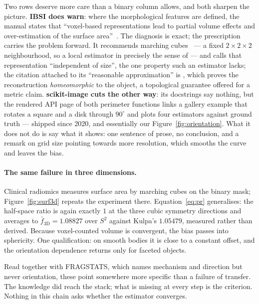 \documentclass{article}
\begin{document}
Two rows deserve more care than a binary column allows, and both sharpen the picture.
\textbf{IBSI does warn}: where the morphological features are defined, the manual states that
``voxel-based representations lead to partial volume effects and over-estimation of the surface
area''~\citep{ibsi2019}. The diagnosis is exact; the prescription carries the problem forward. It
recommends marching cubes~\citep{lorensen1987} --- a fixed $2\times2\times2$ neighbourhood, so a
local estimator in precisely the sense of \citet{tajine2003} --- and calls that representation
``independent of size'', the one property such an estimator lacks; the citation attached to its
``reasonable approximation'' is \citet{stelldinger2007}, which proves the reconstruction
\emph{homeomorphic} to the object, a topological guarantee offered for a metric claim.
\textbf{scikit-image cuts the other way}: its docstrings say nothing, but the rendered API page of
both perimeter functions links a gallery example that rotates a square and a disk through
$90^\circ$ and plots four estimators against ground truth --- shipped since 2020, and essentially
our Figure~\ref{fig:orientation}. What it does not do is say what it shows: one sentence of prose,
no conclusion, and a remark on grid size pointing towards more resolution, which smooths the curve
and leaves the bias.

\paragraph{The same failure in three dimensions.} Clinical radiomics measures surface area by
marching cubes on the binary mask; Figure~\ref{fig:surf3d} repeats the experiment there.
Equation~\eqref{eq:pr} generalises: the half-space ratio is again exactly $1$ at the three cubic
symmetry directions and averages to $\bar f_{3\mathrm D} = 1.08827$ over $S^2$ against Kulpa's
$1.05479$, measured rather than derived. Because voxel-counted volume is convergent, the bias
passes into sphericity. One qualification: on smooth bodies it is close to a constant offset, and
the orientation dependence returns only for faceted objects.

Read together with FRAGSTATS, which names mechanism and direction but never orientation, these
point somewhere more specific than a failure of transfer. The knowledge did reach the stack; what
is missing at every step is the criterion. Nothing in this chain asks whether the estimator
converges.

\end{document}
